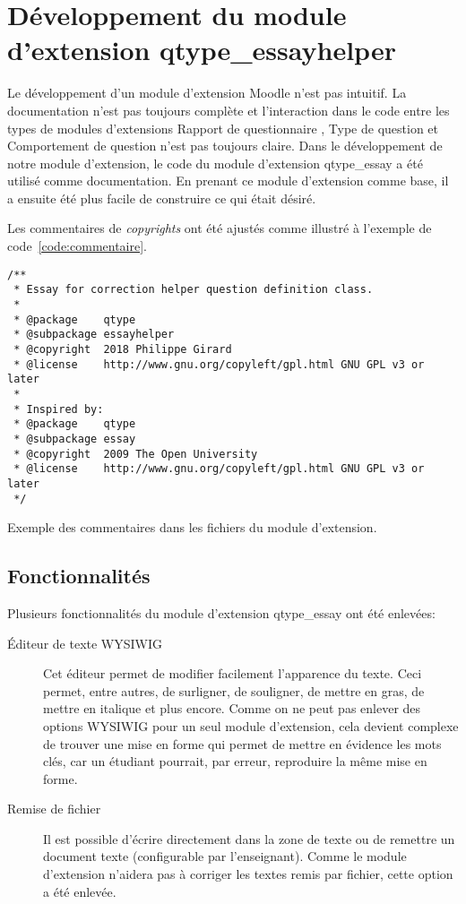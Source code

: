 \chapter{Développement du module d'extension \og qtype\_essayhelper \fg{} }

Le développement d'un module d'extension Moodle n'est pas intuitif.
La documentation n'est pas toujours complète et l'interaction dans le code entre les types de modules d'extensions \og Rapport de questionnaire \fg{}, \og Type de question \fg{} et \og Comportement de question \fg{} n'est pas toujours claire.
Dans le développement de notre module d'extension, le code du module d'extension \og qtype\_essay \fg{} a été utilisé comme documentation.
En prenant ce module d'extension comme base, il a ensuite été plus facile de construire ce qui était désiré.

Les commentaires de \emph{copyrights} ont été ajustés comme illustré à l'exemple de code~\ref{code:commentaire}.

\begin{lstfloat}
\begin{lstlisting}[frame=l]
/**
 * Essay for correction helper question definition class.
 *
 * @package    qtype
 * @subpackage essayhelper
 * @copyright  2018 Philippe Girard
 * @license    http://www.gnu.org/copyleft/gpl.html GNU GPL v3 or later
 *
 * Inspired by:
 * @package    qtype
 * @subpackage essay
 * @copyright  2009 The Open University
 * @license    http://www.gnu.org/copyleft/gpl.html GNU GPL v3 or later
 */
\end{lstlisting}
\caption{Exemple des commentaires dans les fichiers du module d'extension.}
\label{code:commentaire}
\end{lstfloat}

\section{Fonctionnalités}

Plusieurs fonctionnalités du module d'extension \og qtype\_essay \fg{} ont été enlevées:

\begin{description}
  \item[Éditeur de texte WYSIWIG]
  
  Cet \'editeur permet de modifier facilement l'apparence du texte.
  Ceci permet, entre autres, de surligner, de souligner, de mettre en gras, de mettre en italique et plus encore.
  Comme on ne peut pas enlever des options WYSIWIG pour un seul module d'extension, cela devient complexe de trouver une mise en forme qui permet de mettre en évidence les mots clés, car un étudiant pourrait, par erreur, reproduire la même mise en forme.
  
  \item[Remise de fichier]
  
  Il est possible d'écrire directement dans la zone de texte ou de remettre un document texte (configurable par l'enseignant).
  Comme le module d'extension n'aidera pas à corriger les textes remis par fichier, cette option a été enlevée.
\end{description}


